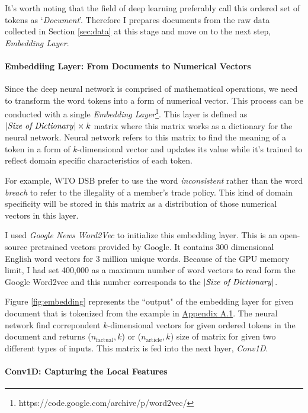 \documentclass[12pt,letterpaper]{article}
\begin{document}
It's worth noting that the field of deep learning preferably call this ordered set of tokens as `\textit{Document}'.
Therefore I prepares documents from the raw data collected in Section \ref{sec:data} at this stage and move on to the next step, \textit{Embedding Layer}.


\paragraph{Embeddiing Layer: From Documents to Numerical Vectors}

Since the deep neural network is comprised of mathematical operations,
we need to transform the word tokens into a form of numerical vector.
This process can be conducted with a single \textit{Embedding Layer}\footnote{https://code.google.com/archive/p/word2vec/}. %
This layer is defined as $|\text{\textit{Size of Dictionary}}| \times k $ matrix where this matrix works as a dictionary for the neural network.
Neural network refers to this matrix to find the meaning of a token in a form of $k$-dimensional vector and updates its value while it's trained to
reflect domain specific characteristics of each token.

For example, WTO DSB prefer to use the word \textit{inconsistent} rather than the word \textit{breach} to refer to the illegality of a member's trade policy.
This kind of domain specificity will be stored in this matrix as a distribution of those numerical vectors in this layer.

I used \textit{Google News Word2Vec} to initialize this embedding layer. This is an open-source pretrained vectors provided by Google. It contains 300 dimensional English word vectors for 3 million unique words. Because of the GPU memory limit, I had set 400,000 as a maximum number of word vectors to read form the Google Word2vec and this number corresponds to the $|\text{\textit{Size of Dictionary}}|$.

Figure \ref{fig:embedding} represents the ``output" of the embedding layer for given document that is tokenized
from the example in \hyperref[sub:factual-aspect-example]{Appendix A.1}.
The neural network find correpondent $k$-dimensional vectors for given ordered tokens in the document and returns ($n_{\text{factual}}, k$) or ($n_{\text{article}}, k$) size of matrix for given two different types of inputs.
This matrix is fed into the next layer, \textit{Conv1D}.


\paragraph{Conv1D: Capturing the Local Features}
\end{document}

